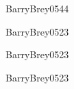 \begin{syllabus}
\begin{unit}{\ARMultiprocessingandalternativearchitectures}{}{BarryBrey05}{4}{4}
    \ARMultiprocessingandalternativearchitecturesAllTopics
    \ARMultiprocessingandalternativearchitecturesAllLearningOutcomes
\end{unit}

\begin{unit}{\ARPerformanceenhancements}{}{BarryBrey05}{2}{3}
    \ARPerformanceenhancementsAllTopics
    \ARPerformanceenhancementsAllLearningOutcomes
\end{unit}

\begin{unit}{\ARMultiprocessingandalternativearchitectures}{}{BarryBrey05}{2}{3}
    \ARMultiprocessingandalternativearchitecturesAllTopics
    \ARMultiprocessingandalternativearchitecturesAllLearningOutcomes
\end{unit}

\begin{unit}{\OSDeviceManagement}{}{BarryBrey05}{2}{3}
    \OSDeviceManagementAllTopics
    \OSDeviceManagementAllLearningOutcomes
\end{unit}

\begin{coursebibliography}
\end{coursebibliography}

\end{syllabus}

